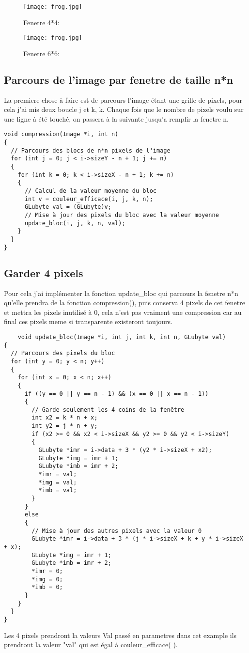 \documentclass{article}
\begin{document}
 \begin{figure}
 \centering
 \texttt{[image: frog.jpg]}
 \caption{\label{fig:4}Fenetre 4*4:}
 \end{figure}

 \begin{figure}
 \centering
 \texttt{[image: frog.jpg]}
 \caption{\label{fig:4}Fenetre 6*6:}
 \end{figure}

\subsection{Parcours de l'image par fenetre de taille n*n}

La premiere chose à faire est de parcours l'image étant une grille de pixels, pour cela j'ai mis deux boucle j et k, k. Chaque fois que le nombre de pixels voulu sur une ligne à été touché, on passera à la suivante jusqu'a remplir la fenetre n.
\begin{verbatim}
void compression(Image *i, int n)
{
  // Parcours des blocs de n*n pixels de l'image
  for (int j = 0; j < i->sizeY - n + 1; j += n)
  {
    for (int k = 0; k < i->sizeX - n + 1; k += n)
    {
      // Calcul de la valeur moyenne du bloc
      int v = couleur_efficace(i, j, k, n);
      GLubyte val = (GLubyte)v;
      // Mise à jour des pixels du bloc avec la valeur moyenne
      update_bloc(i, j, k, n, val);
    }
  }
}
\end{verbatim}



\subsection{Garder 4 pixels}
Pour cela j'ai implémenter la fonction update_bloc qui parcours la fenetre 
 n*n qu'elle prendra de la fonction compression(), puis conserva 4 pixels de
 cet fenetre et mettra les pixels inutilisé à 0, cela n'est pas vraiment une
 compression car au final ces pixels meme si transparente existeront toujours.

\begin{verbatim}
    void update_bloc(Image *i, int j, int k, int n, GLubyte val)
{
  // Parcours des pixels du bloc
  for (int y = 0; y < n; y++)
  {
    for (int x = 0; x < n; x++)
    {
      if ((y == 0 || y == n - 1) && (x == 0 || x == n - 1))
      {
        // Garde seulement les 4 coins de la fenêtre
        int x2 = k * n + x;
        int y2 = j * n + y;
        if (x2 >= 0 && x2 < i->sizeX && y2 >= 0 && y2 < i->sizeY)
        {
          GLubyte *imr = i->data + 3 * (y2 * i->sizeX + x2);
          GLubyte *img = imr + 1;
          GLubyte *imb = imr + 2;
          *imr = val;
          *img = val;
          *imb = val;
        }
      }
      else
      {
        // Mise à jour des autres pixels avec la valeur 0
        GLubyte *imr = i->data + 3 * (j * i->sizeX + k + y * i->sizeX + x);
        GLubyte *img = imr + 1;
        GLubyte *imb = imr + 2;
        *imr = 0;
        *img = 0;
        *imb = 0;
      }
    }
  }
}
\end{verbatim}
Les 4 pixels prendront la valeurs Val passé en parametres dans cet example ils prendront la valeur "val" qui est égal à couleur_efficace( ).
\end{document}
